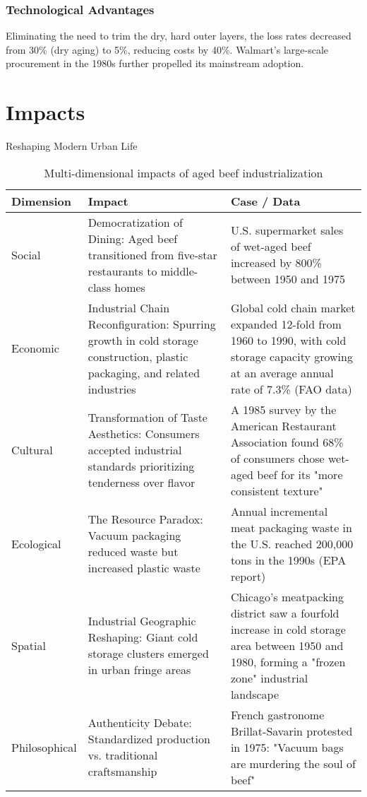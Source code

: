 \documentclass[lettersize,journal]{IEEEtran}
\begin{document}
\subsubsection{Technological Advantages}

Eliminating the need to trim the dry, hard outer layers, the loss rates decreased from 30\% (dry aging) to 5\%, reducing costs by 40\%. Walmart's large-scale procurement in the 1980s further propelled its mainstream adoption.

\section{Impacts}

Reshaping Modern Urban Life

\begin{table}[H]
    \centering
    \begin{tabularx}{0.5\textwidth}{@{}>{\RaggedRight}p{1.5cm}|>{\RaggedRight}p{2.8cm}|>{\RaggedRight\arraybackslash}X@{}} %
        \hline
        \textbf{Dimension} & \textbf{Impact} & \textbf{Case / Data} \\
        \hline
        Social & Democratization of Dining: Aged beef transitioned from five-star restaurants to middle-class homes & U.S. supermarket sales of wet-aged beef increased by 800\% between 1950 and 1975 \\
        \hline
        Economic & Industrial Chain Reconfiguration: Spurring growth in cold storage construction, plastic packaging, and related industries & Global cold chain market expanded 12-fold from 1960 to 1990, with cold storage capacity growing at an average annual rate of 7.3\% (FAO data) \\
        \hline
        Cultural & Transformation of Taste Aesthetics: Consumers accepted industrial standards prioritizing tenderness over flavor & A 1985 survey by the American Restaurant Association found 68\% of consumers chose wet-aged beef for its "more consistent texture" \\
        \hline
        Ecological & The Resource Paradox: Vacuum packaging reduced waste but increased plastic waste & Annual incremental meat packaging waste in the U.S. reached 200,000 tons in the 1990s (EPA report) \\
        \hline
        Spatial & Industrial Geographic Reshaping: Giant cold storage clusters emerged in urban fringe areas & Chicago's meatpacking district saw a fourfold increase in cold storage area between 1950 and 1980, forming a "frozen zone" industrial landscape \\
        \hline
        Philosophical & Authenticity Debate: Standardized production vs. traditional craftsmanship & French gastronome Brillat-Savarin protested in 1975: "Vacuum bags are murdering the soul of beef" \\
        \hline
    \end{tabularx}
    \caption{Multi-dimensional impacts of aged beef industrialization}
    \label{tab:impacts}
\end{table}
\end{document}
